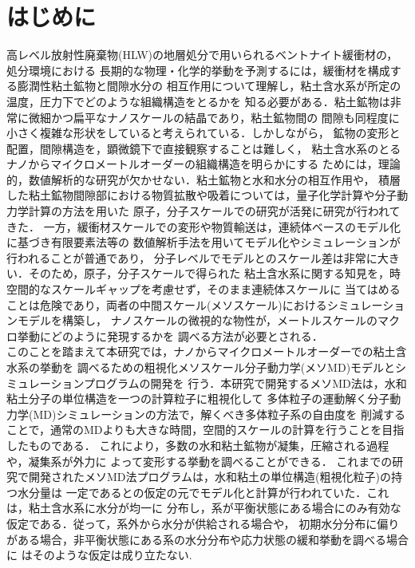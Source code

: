﻿\documentclass[11pt,a4j]{jarticle}
\begin{document}
\section{はじめに}
高レベル放射性廃棄物(HLW)の地層処分で用いられるベントナイト緩衝材の，処分環境における
長期的な物理・化学的挙動を予測するには，緩衝材を構成する膨潤性粘土鉱物と間隙水分の
相互作用について理解し，粘土含水系が所定の温度，圧力下でどのような組織構造をとるかを
知る必要がある．粘土鉱物は非常に微細かつ扁平なナノスケールの結晶であり，粘土鉱物間の
間隙も同程度に小さく複雑な形状をしていると考えられている．しかしながら，
鉱物の変形と配置，間隙構造を，顕微鏡下で直接観察することは難しく，
粘土含水系のとるナノからマイクロメートルオーダーの組織構造を明らかにする
ためには，理論的，数値解析的な研究が欠かせない．粘土鉱物と水和水分の相互作用や，
積層した粘土鉱物間隙部における物質拡散や吸着については，量子化学計算や分子動力学計算の方法を用いた
原子，分子スケールでの研究が活発に研究が行われてきた．
一方，緩衝材スケールでの変形や物質輸送は，連続体ベースのモデル化に基づき有限要素法等の
数値解析手法を用いてモデル化やシミュレーションが行われることが普通であり，
分子レベルでモデルとのスケール差は非常に大きい．そのため，原子，分子スケールで得られた
粘土含水系に関する知見を，時空間的なスケールギャップを考慮せず，そのまま連続体スケールに
当てはめることは危険であり，両者の中間スケール(メソスケール)におけるシミュレーションモデルを構築し，
ナノスケールの微視的な物性が，メートルスケールのマクロ挙動にどのように発現するかを
調べる方法が必要とされる．\\

このことを踏まえて本研究では，ナノからマイクロメートルオーダーでの粘土含水系の挙動を
調べるための粗視化メソスケール分子動力学(メソMD)モデルとシミュレーションプログラムの開発を
行う．本研究で開発するメソMD法は，水和粘土分子の単位構造を一つの計算粒子に粗視化して
多体粒子の運動解く分子動力学(MD)シミュレーションの方法で，解くべき多体粒子系の自由度を
削減することで，通常のMDよりも大きな時間，空間的スケールの計算を行うことを目指したものである．
これにより，多数の水和粘土鉱物が凝集，圧縮される過程や，凝集系が外力に
よって変形する挙動を調べることができる．
これまでの研究で開発されたメソMD法プログラムは，水和粘土の単位構造(粗視化粒子)の持つ水分量は
一定であるとの仮定の元でモデル化と計算が行われていた．これは，粘土含水系に水分が均一に
分布し，系が平衡状態にある場合にのみ有効な仮定である．従って，系外から水分が供給される場合や，
初期水分分布に偏りがある場合，非平衡状態にある系の水分分布や応力状態の緩和挙動を調べる場合に
はそのような仮定は成り立たない.\\
\end{document}
